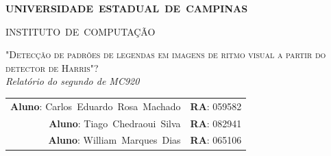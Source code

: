 \documentclass[10pt,a4paper]{article}
\begin{document}
\begin{titlepage}
  \thispagestyle{empty}
  \begin{center} {\large \textbf{UNIVERSIDADE~ESTADUAL~DE~CAMPINAS}} \end{center}
  \begin{center} {\large INSTITUTO~DE~COMPUTAÇÃO}                    \end{center}
  \vspace{0.1cm}
  \begin{center}
    \begin{minipage}[tl]{31mm}
    \end{minipage}
  \end{center}
  \vspace{0.3cm}
  \begin{center} 
    {\large \textsc{"Detecção de padrões de legendas em imagens de ritmo visual a
partir do detector de Harris"?  }} 
    \\\vspace{0.5cm}
    {\textsl{Relatório do segundo de MC920}}
    \\\vspace{1cm}
    \begin{tabular}{rl}
      \textbf{Aluno}:   Carlos~Eduardo~Rosa~Machado &
      \textbf{RA}:          059582 \\ 
      \textbf{Aluno}:        Tiago~Chedraoui~Silva & 
      \textbf{RA}:        082941 \\
      \textbf{Aluno}:        William~Marques~Dias & 
      \textbf{RA}:        065106 \\
    \end{tabular}
  \end{center}
  \vspace{0.5cm}


  \begin{abstract}
A consistência de um filto de bordas é de suma importância para
interpretações de sequências de imagens 3D para recursos que utilizam
algoritmos rastreamento. 

Para abranger as regiões da iagem que contém testura e características isoladas, 
uma combinação de detector de bordas e cantos baseados na função de
auto-correlação local é utilizado.

A partir do dector de Harris, avaliou-se a detecção de padrões de
legendas em imagens de ritmo visual.

  \end{abstract}
  \tableofcontents
\end{titlepage} 
\end{document}
